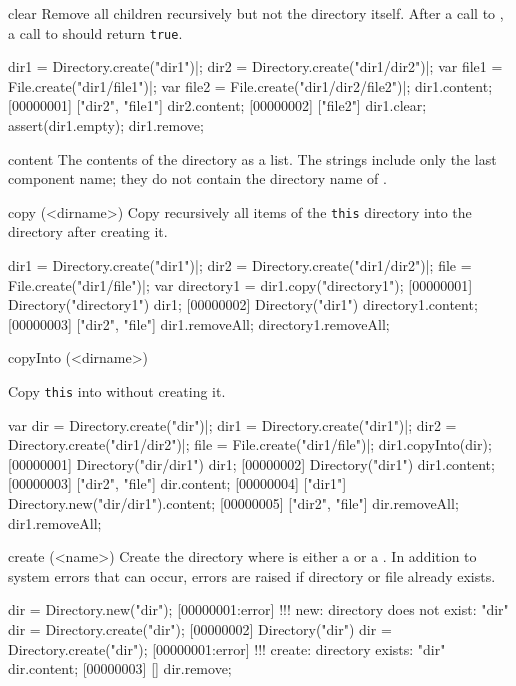 \begin{urbiscriptapi}
\item[clear]
  Remove all children recursively but not the directory itself. After a
  call to , a call to  should return
  \lstinline|true|.
\begin{urbiscript}
dir1 = Directory.create("dir1")|;
dir2 = Directory.create("dir1/dir2")|;
var file1 = File.create("dir1/file1")|;
var file2 = File.create("dir1/dir2/file2")|;
dir1.content;
[00000001] ["dir2", "file1"]
dir2.content;
[00000002] ["file2"]
dir1.clear;
assert(dir1.empty);
dir1.remove;
\end{urbiscript}


\item[content]
  The contents of the directory as a  list.  The
  strings include only the last component name; they do not contain
  the directory name of \this.


\item[copy](<dirname>)
  Copy recursively all items of the \lstinline|this| directory
  into the directory  after creating it.
\begin{urbiscript}
dir1 = Directory.create("dir1")|;
dir2 = Directory.create("dir1/dir2")|;
file = File.create("dir1/file")|;
var directory1 = dir1.copy("directory1");
[00000001] Directory("directory1")
dir1;
[00000002] Directory("dir1")
directory1.content;
[00000003] ["dir2", "file"]
dir1.removeAll;
directory1.removeAll;
\end{urbiscript}


\item[copyInto](<dirname>)
  \experimental{}

  Copy \lstinline|this| into  without creating it.
\begin{urbiscript}
var dir = Directory.create("dir")|;
dir1 = Directory.create("dir1")|;
dir2 = Directory.create("dir1/dir2")|;
file = File.create("dir1/file")|;
dir1.copyInto(dir);
[00000001] Directory("dir/dir1")
dir1;
[00000002] Directory("dir1")
dir1.content;
[00000003] ["dir2", "file"]
dir.content;
[00000004] ["dir1"]
Directory.new("dir/dir1").content;
[00000005] ["dir2", "file"]
dir.removeAll;
dir1.removeAll;
\end{urbiscript}


\item[create](<name>)
  Create the directory  where  is either a
   or a . In addition to system errors that
  can occur, errors are raised if directory or file  already exists.
\begin{urbiscript}
dir = Directory.new("dir");
[00000001:error] !!! new: directory does not exist: "dir"
dir = Directory.create("dir");
[00000002] Directory("dir")
dir = Directory.create("dir");
[00000001:error] !!! create: directory exists: "dir"
dir.content;
[00000003] []
dir.remove;
\end{urbiscript}



\end{urbiscriptapi}
